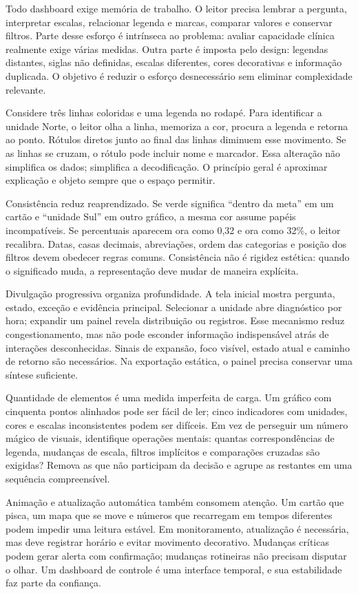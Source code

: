 Todo dashboard exige memória de trabalho. O leitor precisa lembrar a pergunta, interpretar escalas, relacionar legenda e marcas, comparar valores e conservar filtros. Parte desse esforço é intrínseca ao problema: avaliar capacidade clínica realmente exige várias medidas. Outra parte é imposta pelo design: legendas distantes, siglas não definidas, escalas diferentes, cores decorativas e informação duplicada. O objetivo é reduzir o esforço desnecessário sem eliminar complexidade relevante.

Considere três linhas coloridas e uma legenda no rodapé. Para identificar a unidade Norte, o leitor olha a linha, memoriza a cor, procura a legenda e retorna ao ponto. Rótulos diretos junto ao final das linhas diminuem esse movimento. Se as linhas se cruzam, o rótulo pode incluir nome e marcador. Essa alteração não simplifica os dados; simplifica a decodificação. O princípio geral é aproximar explicação e objeto sempre que o espaço permitir.

Consistência reduz reaprendizado. Se verde significa ``dentro da meta'' em um cartão e ``unidade Sul'' em outro gráfico, a mesma cor assume papéis incompatíveis. Se percentuais aparecem ora como 0,32 e ora como 32\%, o leitor recalibra. Datas, casas decimais, abreviações, ordem das categorias e posição dos filtros devem obedecer regras comuns. Consistência não é rigidez estética: quando o significado muda, a representação deve mudar de maneira explícita.

Divulgação progressiva organiza profundidade. A tela inicial mostra pergunta, estado, exceção e evidência principal. Selecionar a unidade abre diagnóstico por hora; expandir um painel revela distribuição ou registros. Esse mecanismo reduz congestionamento, mas não pode esconder informação indispensável atrás de interações desconhecidas. Sinais de expansão, foco visível, estado atual e caminho de retorno são necessários. Na exportação estática, o painel precisa conservar uma síntese suficiente.

Quantidade de elementos é uma medida imperfeita de carga. Um gráfico com cinquenta pontos alinhados pode ser fácil de ler; cinco indicadores com unidades, cores e escalas inconsistentes podem ser difíceis. Em vez de perseguir um número mágico de visuais, identifique operações mentais: quantas correspondências de legenda, mudanças de escala, filtros implícitos e comparações cruzadas são exigidas? Remova as que não participam da decisão e agrupe as restantes em uma sequência compreensível.

Animação e atualização automática também consomem atenção. Um cartão que pisca, um mapa que se move e números que recarregam em tempos diferentes podem impedir uma leitura estável. Em monitoramento, atualização é necessária, mas deve registrar horário e evitar movimento decorativo. Mudanças críticas podem gerar alerta com confirmação; mudanças rotineiras não precisam disputar o olhar. Um dashboard de controle é uma interface temporal, e sua estabilidade faz parte da confiança.

